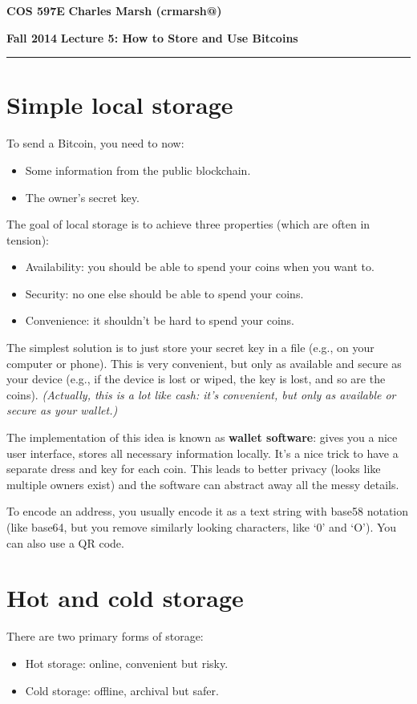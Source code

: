 \documentclass[12pt]{article}
\makeatletter
\newcommand{\myheader}[4]
{\vspace*{-0.5in}
\noindent
{#1} \hfill {#3}

\noindent
{#2} \hfill {#4}

\noindent
\rule[8pt]{\textwidth}{1pt}

\vspace{1ex} 
}  %
\newcommand{\myalgsheader}[0]
{\myheader
{ {\bf{COS 597E}} }
{ {\bf{Fall 2014}} }
{ {\bf{Charles Marsh (crmarsh@)}} }
{ {\bf{Lecture 5: How to Store and Use Bitcoins}} }
}
\makeatother
\begin{document}
\myalgsheader

\pagestyle{plain}

\section*{Simple local storage}

To send a Bitcoin, you need to now:
\begin{itemize}
\item Some information from the public blockchain.
\item The owner's secret key.
\end{itemize}

The goal of local storage is to achieve three properties (which are often in tension):
\begin{itemize}
\item Availability: you should be able to spend your coins when you want to.
\item Security: no one else should be able to spend your coins.
\item Convenience: it shouldn't be hard to spend your coins.
\end{itemize}

The simplest solution is to just store your secret key in a file (e.g., on your computer or phone). This is very convenient, but only as available and secure as your device (e.g., if the device is lost or wiped, the key is lost, and so are the coins). \textit{(Actually, this is a lot like cash: it's convenient, but only as available or secure as your wallet.)}

The implementation of this idea is known as \textbf{wallet software}: gives you a nice user interface, stores all necessary information locally. It's a nice trick to have a separate dress and key for each coin. This leads to better privacy (looks like multiple owners exist) and the software can abstract away all the messy details.

To encode an address, you usually encode it as a text string with base58 notation (like base64, but you remove similarly looking characters, like `0' and `O'). You can also use a QR code.

\section*{Hot and cold storage}

There are two primary forms of storage:
\begin{itemize}
\item Hot storage: online, convenient but risky.
\item Cold storage: offline, archival but safer.
\end{itemize}
\end{document}
